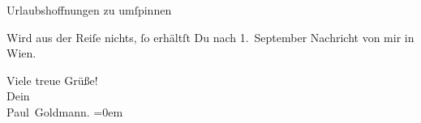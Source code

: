               Urlaubshoffnungen zu umſpinnen{\dotsfour}\pend
           
\pstart
           Wird aus der Reiſe nichts,{ }ſo erhältſt Du nach 1. September Nachricht von mir in Wien.\pend
           
\pstart
           Viele treue Grüße! {\\[\baselineskip]}Dein {\\[\baselineskip]}\spacefill\mbox{Paul Goldmann.}\pend
           \leftskip=0em{}\endnumbering{}  \newcommand{\dateiname}{L02713}\newcommand{\titel}{Paul Goldmann an Arthur Schnitzler, 23. 8. [1893]}\newcommand{\editorInnen}{Martin Anton Müller und Laura Untner}
